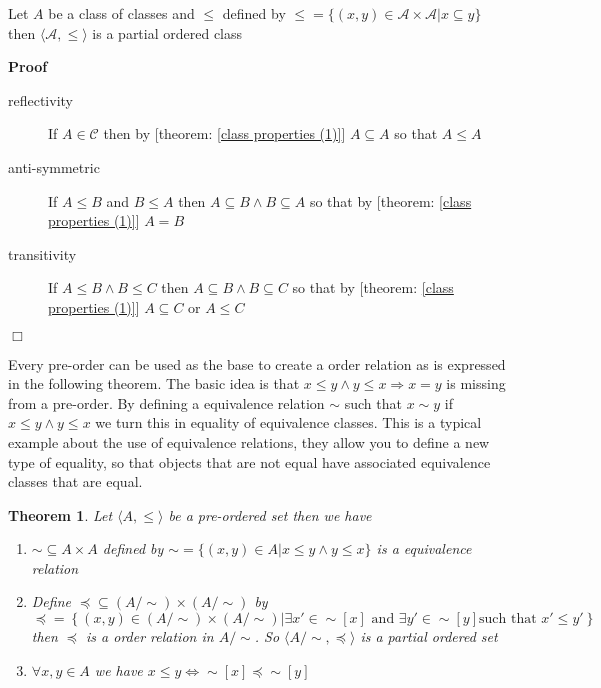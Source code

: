 \documentclass{book}
\newenvironment{proof}{\noindent\textbf{Proof\ }}{\hspace*{\fill}$\Box$\medskip}
\newtheorem{theorem}{Theorem}
\begin{document}
\begin{example}
  \label{order inclusion is a order}Let $A$ be a class of classes and
  $\leqslant$ defined by $\leqslant = \{ (x, y) \in \mathcal{A} \times
  \mathcal{A}|x \subseteq y \}$ then $\langle \mathcal{A}, \leqslant \rangle$
  is a partial ordered class
\end{example}

\begin{proof}
  
  \begin{description}
    \item[reflectivity] If $A \in \mathcal{C}$ then by [theorem: \ref{class
    properties (1)}] $A \subseteq A$ so that $A \leqslant A$
    
    \item[anti-symmetric] If $A \leqslant B$ and $B \leqslant A$ then $A
    \subseteq B \wedge B \subseteq A$ so that by [theorem: \ref{class
    properties (1)}] $A = B$
    
    \item[transitivity] If $A \leqslant B \wedge B \leqslant C$ then $A
    \subseteq B \wedge B \subseteq C$ so that by [theorem: \ref{class
    properties (1)}] $A \subseteq C$ or $A \leqslant C$
  \end{description}
\end{proof}

Every pre-order can be used as the base to create a order relation as is
expressed in the following theorem. The basic idea is that $x \leqslant y
\wedge y \leqslant x \Rightarrow x = y$ is missing from a pre-order. By
defining a equivalence relation $\sim$ such that $x \sim y$ if $x \leqslant y
\wedge y \leqslant x$ we turn this in equality of equivalence classes. This is
a typical example about the use of equivalence relations, they allow you to
define a new type of equality, so that objects that are not equal have
associated equivalence classes that are equal.

\begin{theorem}
  \label{order eq order preorder to order}Let $\langle A, \leqslant \rangle$
  be a pre-ordered set then we have
  \begin{enumerate}
    \item $\sim \subseteq A \times A$ defined by $\sim = \{ (x, y) \in A|x
    \leqslant y \wedge y \leqslant x \}$ is a equivalence relation
    
    \item Define $\preccurlyeq \subseteq (A / \sim) \times (A / \sim)$ by
    \[ \preccurlyeq = \left\{ (x, y) \in (A / \sim) \times (A / \sim) |
       \exists x' \in \sim [x] \text{ and } \exists y' \in \sim [y] \text{
       such that $x' \leqslant y'$} \right\} \]
    then $\preccurlyeq$ is a order relation in $A / \sim$. So $\langle A /
    \sim, \preccurlyeq \rangle$ is a partial ordered set
    
    \item $\forall x, y \in A$ we have $x \leqslant y \Leftrightarrow \sim [x]
    \preccurlyeq \sim [y]$
  \end{enumerate}
\end{theorem}
\end{document}
